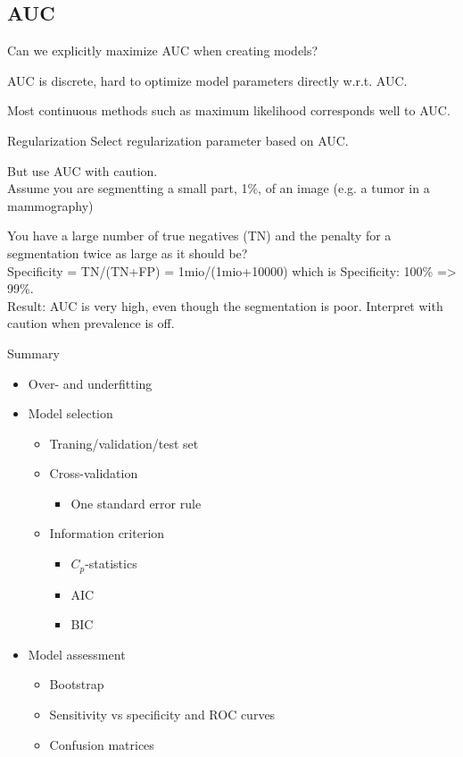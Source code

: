 \subsection{AUC}

Can we explicitly maximize AUC when creating models?

AUC is discrete, hard to optimize model parameters directly
w.r.t. AUC.

Most continuous methods such as maximum likelihood
corresponds well to AUC.

Regularization
Select regularization parameter based on AUC.

But use AUC with caution.\\

Assume you are segmentting a small part, 1\%, of an image (e.g. a
tumor in a mammography)

You have a large number of true negatives (TN) and the penalty for a segmentation twice as large as it should be?\\

Specificity = TN/(TN+FP) = 1mio/(1mio+10000) which is Specificity: 100\% => 99\%.\\

Result: AUC is very high, even though the segmentation is poor.
Interpret with caution when prevalence is off.


Summary

\begin{itemize}
  \item Over- and underfitting
  \item Model selection
  \begin{itemize}
    \item Traning/validation/test set
    \item Cross-validation
    \begin{itemize}
      \item One standard error rule
    \end{itemize}
    \item Information criterion
    \begin{itemize}
      \item $C_p$-statistics
      \item AIC
      \item BIC
    \end{itemize}
  \end{itemize}
  \item Model assessment
  \begin{itemize}
    \item Bootstrap
    \item Sensitivity vs specificity and ROC curves
    \item Confusion matrices
  \end{itemize}
\end{itemize}

